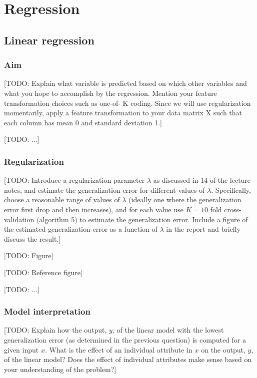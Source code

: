 \documentclass[dtu]{dtuarticle}
\newcommand{\todo}[1]{\color{red}[TODO: #1]\color{black}}
\begin{document}
	\tableofcontents

	\newpage

	\section{Regression}

	\subsection{Linear regression}

	\subsubsection{Aim}

	\todo{Explain what variable is predicted based on which other variables and what you hope to
		accomplish by the regression. Mention your feature transformation choices such as one-of-
		K coding. Since we will use regularization momentarily, apply a feature transformation to
		your data matrix X such that each column has mean 0 and standard deviation 1.}

	\todo{...}

	\subsubsection{Regularization}

	\todo{Introduce a regularization parameter $\lambda$ as discussed in 14 of the lecture notes, and estimate
		the generalization error for different values of $\lambda$. Specifically, choose a reasonable range of
		values of $\lambda$ (ideally one where the generalization error first drop and then increases), and
		for each value use $K = 10$ fold cross-validation (algorithm 5) to estimate the generalization
		error. Include a figure of the estimated generalization error as a function of $\lambda$ in the report
		and briefly discuss the result.}

	\todo{Figure}

	\todo{Reference figure}

	\todo{...}

	\subsubsection{Model interpretation}

	\todo{Explain how the output, $y$, of the linear model with the lowest generalization error (as
		determined in the previous question) is computed for a given input $x$. What is the effect
		of an individual attribute in $x$ on the output, $y$, of the linear model? Does the effect of
		individual attributes make sense based on your understanding of the problem?}
\end{document}
